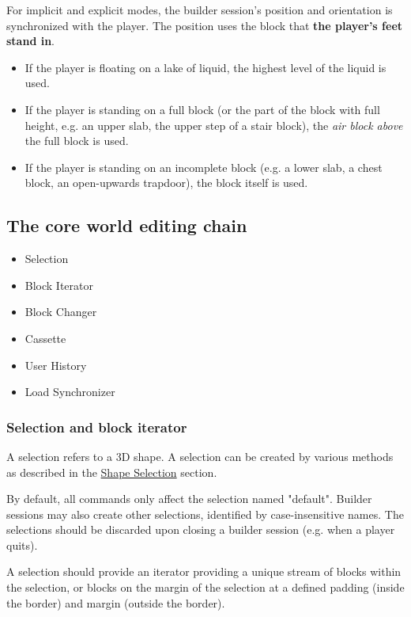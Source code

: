 \documentclass{article}
\begin{document}
			For implicit and explicit modes, the builder session's position and orientation is synchronized with the
			player. The position uses the block that \textbf{the player's feet stand in}.
			\begin{itemize}
				\item If the player is floating on a lake of liquid, the highest level of the liquid is used.
				\item If the player is standing on a full block (or the part of the block with full height, e.g. an upper slab, the upper step of a stair block), the \emph{air block above} the full block is used.
				\item If the player is standing on an incomplete block (e.g. a lower slab, a chest block, an open-upwards trapdoor), the block itself is used.
			\end{itemize}

		\subsection{The core world editing chain}
			\begin{itemize}
				\item Selection
				\item Block Iterator
				\item Block Changer
				\item Cassette
				\item User History
				\item Load Synchronizer
			\end{itemize}

			\subsubsection{Selection and block iterator}
				A selection refers to a 3D shape. A selection can be created by various methods as described in the
				\hyperref[sec:shape-selection]{Shape Selection} section.

				By default, all commands only affect the selection named "default". Builder sessions may also create
				other selections, identified by case-insensitive names. The selections should be discarded upon closing
				a builder session (e.g. when a player quits).

				A selection should provide an iterator providing a unique stream of blocks within the selection, or
				blocks on the margin of the selection at a defined padding (inside the border) and margin (outside the
				border).
\end{document}
